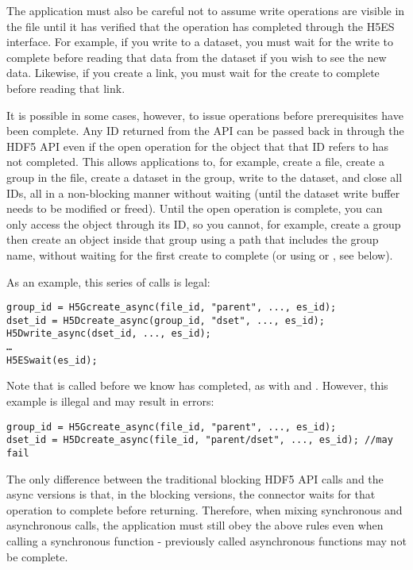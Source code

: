 \documentclass[../users_guide.tex]{subfiles}
\begin{document}
The application must also be careful not to assume write operations are visible
in the file until it has verified that the operation has completed through the
H5ES interface. For example, if you write to a dataset, you must wait for the
write to complete before reading that data from the dataset if you wish to see
the new data. Likewise, if you create a link, you must wait for the create to
complete before reading that link.

It is possible in some cases, however, to issue operations before prerequisites
have been complete. Any ID returned from the API can be passed back in through
the HDF5 API even if the open operation for the object that that ID refers to
has not completed. This allows applications to, for example, create a file,
create a group in the file, create a dataset in the group, write to the dataset,
and close all IDs, all in a non-blocking manner without waiting (until the
dataset write buffer needs to be modified or freed). Until the open operation is
complete, you can only access the object through its ID, so you cannot, for
example, create a group then create an object inside that group using a path
that includes the group name, without waiting for the first create to complete
(or using  or , see
below).

As an example, this series of calls is legal:

\begin{verbatim}
group_id = H5Gcreate_async(file_id, "parent", ..., es_id);
dset_id = H5Dcreate_async(group_id, "dset", ..., es_id);
H5Dwrite_async(dset_id, ..., es_id);
…
H5ESwait(es_id);
\end{verbatim}

Note that  is called before we know
 has completed, as with
 and . However,
this example is illegal and may result in errors:

\begin{verbatim}
group_id = H5Gcreate_async(file_id, "parent", ..., es_id);
dset_id = H5Dcreate_async(file_id, "parent/dset", ..., es_id); //may fail
\end{verbatim}

The only difference between the traditional blocking HDF5 API calls and the
async versions is that, in the blocking versions, the connector waits for that
operation to complete before returning. Therefore, when mixing synchronous and
asynchronous calls, the application must still obey the above rules even when
calling a synchronous function - previously called asynchronous functions may
not be complete.
\end{document}
